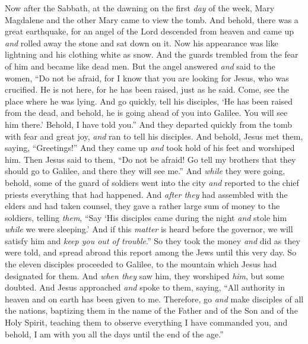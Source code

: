 \begin{biblechapter} %
 Now after the Sabbath, at the dawning on the first \textit{day} of the week, Mary Magdalene and the other Mary came to view the tomb.
\verse And behold, there was a great earthquake, for an angel of the Lord descended from heaven and came up \textit{and} rolled away the stone and sat down on it.
\verse Now his appearance was like lightning and his clothing white as snow.
\verse And the guards trembled from the fear of him and became like dead men.
\verse But the angel answered \textit{and} said to the women, “Do not be afraid, for I know that you are looking for Jesus, who was crucified.
\verse He is not here, for he has been raised, just as he said. Come, see the place where he was lying.
\verse And go quickly, tell his disciples, ‘He has been raised from the dead, and behold, he is going ahead of you into Galilee. You will see him there.’ Behold, I have told you.”
\verse And they departed quickly from the tomb with fear and great joy, \textit{and} ran to tell his disciples.
\verse And behold, Jesus met them, saying, “Greetings!” And they came up \textit{and} took hold of his feet and worshiped him.
\verse Then Jesus said to them, “Do not be afraid! Go tell my brothers that they should go to Galilee, and there they will see me.”
 And \textit{while} they were going, behold, some of the guard of soldiers went into the city \textit{and} reported to the chief priests everything that had happened.
\verse And \textit{after they} had assembled with the elders and had taken counsel, they gave a rather large sum of money to the soldiers,
\verse telling \textit{them}, “Say ‘His disciples came during the night \textit{and} stole him \textit{while} we were sleeping.’
\verse And if this \textit{matter} is heard before the governor, we will satisfy him and \textit{keep you out of trouble}.”
\verse So they took the money \textit{and} did as they were told, and spread abroad this report among the Jews until this very day.
 So the eleven disciples proceeded to Galilee, to the mountain which Jesus had designated for them.
\verse And \textit{when they} saw him, they worshiped \textit{him}, but some doubted.
\verse And Jesus approached \textit{and} spoke to them, saying, “All authority in heaven and on earth has been given to me.
\verse Therefore, go \textit{and} make disciples of all the nations, baptizing them in the name of the Father and of the Son and of the Holy Spirit,
\verse teaching them to observe everything I have commanded you, and behold, I am with you all the days until the end of the age.”
\end{biblechapter}

